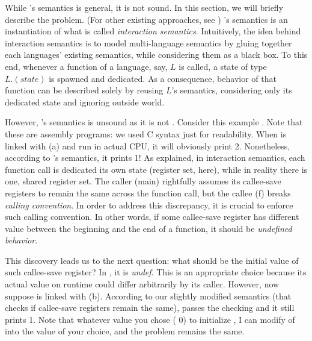 {%
While \ccc{}'s semantics is general, it is not sound.
In this section, we will briefly describe the problem.
(For other existing approaches, see )
\ccc{}'s semantics is an instantiation of what is called \textit{interaction semantics}.
Intuitively, the idea behind interaction semantics is to model multi-language semantics by gluing together each languages' existing semantics, while considering them as a black box.
To this end, whenever a function of a language, say, $L$ is called, a state of type $L.(state)$ is spawned and dedicated.
As a consequence, behavior of that function can be described solely by reusing $L$'s semantics, considering only its dedicated state and ignoring outside world.


However, \ccc{}'s semantics is unsound as it is not \lbound{}.
Consider this example .
Note that these are assembly programs: we used C syntax just for readability.
When %
 is linked with (a)
and run in actual CPU, it will obviously print 2.
Nonetheless, according to \ccc{}'s semantics, it prints 1!
As explained, in interaction semantics, each function call is dedicated its own state (register set, here), while in reality there is one, shared register set.
The caller (main) rightfully assumes its callee-save registers to remain the same across the function call, but the callee (f) breaks \textit{calling convention}.
In order to address this discrepancy, it is crucial to enforce such calling convention. %
In other words, if some callee-save register has different value between the beginning and the end of a function, it should be \textit{undefined behavior}.



This discovery leads us to the next question: what should be the initial value of such callee-save register?
In \ccc{}, it is \textit{undef}.
This is an appropriate choice because its actual value on runtime could differ arbitrarily by its caller. %
However, now suppose  is linked with (b).
According to our slightly modified semantics (that checks if callee-save registers remain the same),  passes the checking and it still prints 1.
Note that whatever value you chose (\eg{} 0) to initialize , I can modify  of  into the value of your choice, and the problem remains the same.


}
